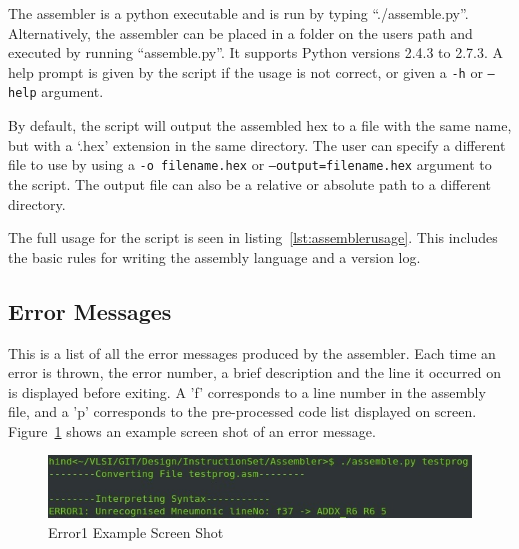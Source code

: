 The assembler is a python executable and is run by typing ``./assemble.py''. 
Alternatively, the assembler can be placed in a folder on the users path and executed by running ``assemble.py''.
It supports Python versions 2.4.3 to 2.7.3.
A help prompt is given by the script if the usage is not correct, or given a \texttt{-h} or \texttt{--help} argument. 

By default, the script will output the assembled hex to a file with the same name, but with a `.hex' extension in the same directory.
The user can specify a different file to use by using a \texttt{-o filename.hex} or \texttt{--output=filename.hex} argument to the script.
The output file can also be a relative or absolute path to a different directory. 

The full usage for the script is seen in listing~\ref{lst:assemblerusage}. 
This includes the basic rules for writing the assembly language and a version log. 



\newpage
\subsection{Error Messages}
This is a list of all the error messages produced by the assembler. Each time an error is thrown, the error number, a brief description and the line it occurred on is displayed before exiting. A 'f' corresponds to a line number in the assembly file, and a 'p' corresponds to the pre-processed code list displayed on screen. Figure~\ref{fig:AssErrorEx} shows an example screen shot of an error message.

\begin{figure}[h]
	\includegraphics{error1screenshot.jpg}
	\caption{Error1 Example Screen Shot}
	\label{fig:AssErrorEx}
\end{figure}

